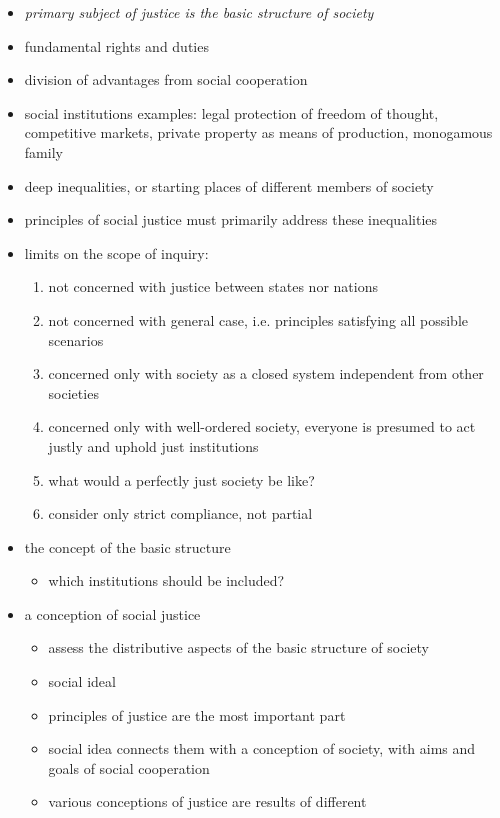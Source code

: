 \begin{itemize}
	\item \textit{primary subject of justice is the basic structure of
	society}
	\item fundamental rights and duties
	\item division of advantages from social cooperation
	\item social institutions examples: legal protection of freedom of
	thought, competitive markets, private property as means of production,
	monogamous family
	\item deep inequalities, or starting places of different members of
	society
	\item principles of social justice must primarily address these
	inequalities
	\item limits on the scope of inquiry:
	\begin{enumerate}
		\item not concerned with justice between states nor nations
		\item not concerned with general case, i.e. principles
		satisfying all possible scenarios
		\item concerned only with society as a closed system
		independent from other societies
		\item concerned only with well-ordered society, everyone is
		presumed to act justly and uphold just institutions
		\item what would a perfectly just society be like?
		\item consider only strict compliance, not partial
	\end{enumerate}
	\item the concept of the basic structure
	\begin{itemize}
		\item which institutions should be included?
	\end{itemize}
	\item a conception of social justice
	\begin{itemize}
		\item assess the distributive aspects of the basic structure
		of society
		\item social ideal
		\item principles of justice are the most important part
		\item social idea connects them with a conception of society,
		with aims and goals of social cooperation
		\item various conceptions of justice are results of different

\end{itemize}
\end{itemize}

